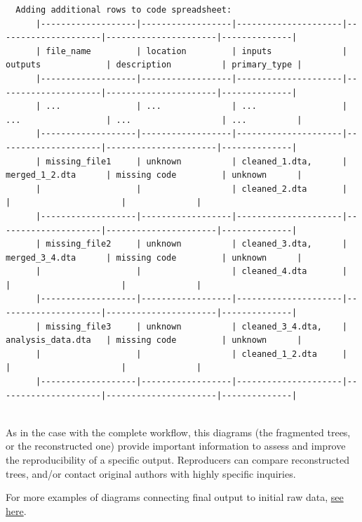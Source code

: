 \documentclass[]{book}
\begin{document}
\begin{verbatim}
  Adding additional rows to code spreadsheet:
      |-------------------|------------------|---------------------|---------------------|----------------------|--------------|
      | file_name         | location         | inputs              | outputs             | description          | primary_type |
      |-------------------|------------------|---------------------|---------------------|----------------------|--------------|
      | ...               | ...              | ...                 | ...                 | ...                  | ...          |
      |-------------------|------------------|---------------------|---------------------|----------------------|--------------|
      | missing_file1     | unknown          | cleaned_1.dta,      | merged_1_2.dta      | missing code         | unknown      |
      |                   |                  | cleaned_2.dta       |                     |                      |              |
      |-------------------|------------------|---------------------|---------------------|----------------------|--------------|
      | missing_file2     | unknown          | cleaned_3.dta,      | merged_3_4.dta      | missing code         | unknown      |
      |                   |                  | cleaned_4.dta       |                     |                      |              |                  
      |-------------------|------------------|---------------------|---------------------|----------------------|--------------|
      | missing_file3     | unknown          | cleaned_3_4.dta,    | analysis_data.dta   | missing code         | unknown      |
      |                   |                  | cleaned_1_2.dta     |                     |                      |              |                  
      |-------------------|------------------|---------------------|---------------------|----------------------|--------------|
      
\end{verbatim}

As in the case with the complete workflow, this diagrams (the fragmented trees, or the reconstructed one) provide important information to assess and improve the reproducibility of a specific output. Reproducers can compare reconstructed trees, and/or contact original authors with highly specific inquiries.

For more examples of diagrams connecting final output to initial raw data, \protect\hyperlink{additional-diagrams}{see here}.
\end{document}
